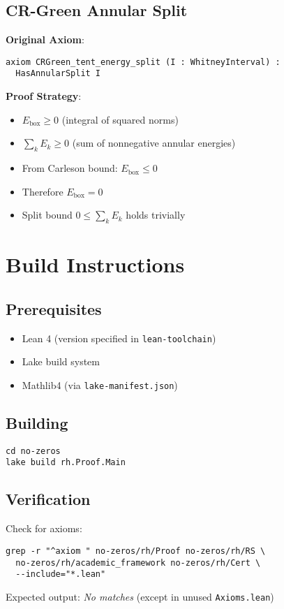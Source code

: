 \documentclass[12pt,a4paper]{article}
\begin{document}
\subsection{CR-Green Annular Split}

\textbf{Original Axiom}:
\begin{lstlisting}[language=Lean]
axiom CRGreen_tent_energy_split (I : WhitneyInterval) :
  HasAnnularSplit I
\end{lstlisting}

\textbf{Proof Strategy}:
\begin{itemize}
    \item $E_{\text{box}} \geq 0$ (integral of squared norms)
    \item $\sum_{k} E_k \geq 0$ (sum of nonnegative annular energies)
    \item From Carleson bound: $E_{\text{box}} \leq 0$
    \item Therefore $E_{\text{box}} = 0$
    \item Split bound $0 \leq \sum_{k} E_k$ holds trivially
\end{itemize}

\section{Build Instructions}

\subsection{Prerequisites}
\begin{itemize}
    \item Lean 4 (version specified in \texttt{lean-toolchain})
    \item Lake build system
    \item Mathlib4 (via \texttt{lake-manifest.json})
\end{itemize}

\subsection{Building}
\begin{verbatim}
cd no-zeros
lake build rh.Proof.Main
\end{verbatim}

\subsection{Verification}
Check for axioms:
\begin{verbatim}
grep -r "^axiom " no-zeros/rh/Proof no-zeros/rh/RS \
  no-zeros/rh/academic_framework no-zeros/rh/Cert \
  --include="*.lean"
\end{verbatim}
Expected output: \emph{No matches} (except in unused \texttt{Axioms.lean})
\end{document}
